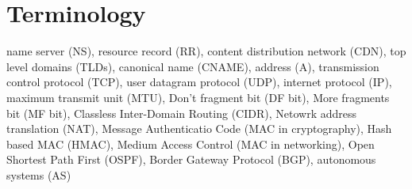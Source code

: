\section{Terminology}
name server (NS), resource record (RR), content distribution network
(CDN), top level domains (TLDs), canonical name (CNAME), address (A),
transmission control protocol (TCP), user datagram protocol (UDP),
internet protocol (IP), maximum transmit unit (MTU), Don't fragment bit
(DF bit), More fragments bit (MF bit), Classless Inter-Domain Routing
(CIDR), Netowrk address translation (NAT), Message Authenticatio Code
(MAC in cryptography), Hash based MAC (HMAC), Medium Access Control (MAC
in networking), Open Shortest Path First (OSPF), Border Gateway Protocol
(BGP), autonomous systems (AS)